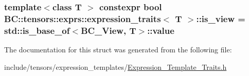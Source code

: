 \subsubsection[{\texorpdfstring{is\+\_\+view}{is_view}}]{\setlength{\rightskip}{0pt plus 5cm}template$<$class T $>$ constexpr bool {\bf B\+C\+::tensors\+::exprs\+::expression\+\_\+traits}$<$ T $>$\+::is\+\_\+view = std\+::is\+\_\+base\+\_\+of$<${\bf B\+C\+\_\+\+View}, T$>$\+::value\hspace{0.3cm}{\ttfamily [static]}}\hypertarget{structBC_1_1tensors_1_1exprs_1_1expression__traits_ac41debc0a82fa70128a31a3192610e5a}{}\label{structBC_1_1tensors_1_1exprs_1_1expression__traits_ac41debc0a82fa70128a31a3192610e5a}


The documentation for this struct was generated from the following file\+:\begin{DoxyCompactItemize}
\item 
include/tensors/expression\+\_\+templates/\hyperlink{Expression__Template__Traits_8h}{Expression\+\_\+\+Template\+\_\+\+Traits.\+h}\end{DoxyCompactItemize}
